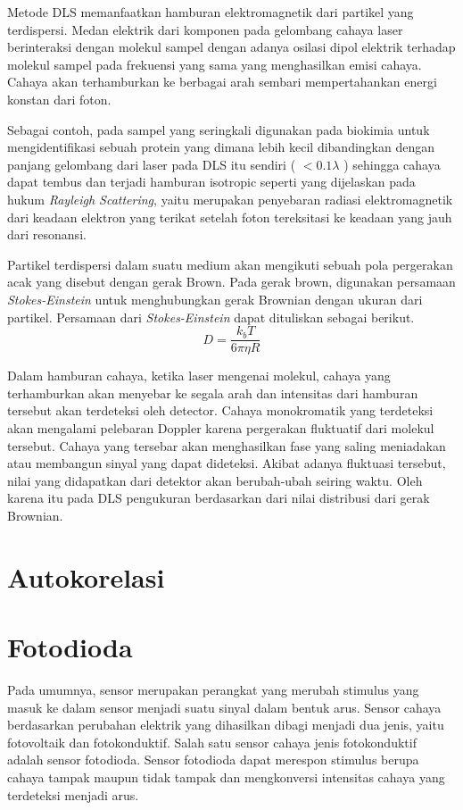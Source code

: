 Metode DLS memanfaatkan hamburan elektromagnetik dari partikel yang terdispersi. Medan elektrik
dari komponen pada gelombang cahaya laser berinteraksi dengan molekul sampel dengan adanya osilasi
dipol elektrik terhadap molekul sampel pada frekuensi yang sama yang menghasilkan emisi cahaya.
Cahaya akan terhamburkan ke berbagai arah sembari mempertahankan energi konstan dari foton. 

Sebagai contoh, pada sampel yang seringkali digunakan pada biokimia untuk mengidentifikasi sebuah
protein yang dimana lebih kecil dibandingkan dengan panjang gelombang dari laser pada DLS itu
sendiri ( $<0.1\lambda$ ) sehingga cahaya dapat tembus dan terjadi hamburan isotropic seperti yang
dijelaskan pada hukum \textit{Rayleigh Scattering}, yaitu merupakan penyebaran radiasi
elektromagnetik dari keadaan elektron yang terikat setelah foton tereksitasi ke keadaan yang jauh
dari resonansi\cite{Piazza2005}.

Partikel terdispersi dalam suatu medium akan mengikuti sebuah pola pergerakan acak yang disebut
dengan gerak Brown. Pada gerak brown, digunakan persamaan \textit{Stokes-Einstein} untuk
menghubungkan gerak Brownian dengan ukuran dari partikel\cite{Anindya2018}. Persamaan dari
\textit{Stokes-Einstein} dapat dituliskan sebagai berikut.
\begin{equation}
    D = \frac{k_b T}{6 \pi \eta R}
\end{equation}

Dalam hamburan cahaya, ketika laser mengenai molekul, cahaya yang terhamburkan akan menyebar ke
segala arah dan intensitas dari hamburan tersebut akan terdeteksi oleh detector. Cahaya monokromatik
yang terdeteksi akan mengalami pelebaran Doppler karena pergerakan fluktuatif dari molekul tersebut.
Cahaya yang tersebar akan menghasilkan fase yang saling meniadakan atau membangun sinyal yang dapat
dideteksi. Akibat adanya fluktuasi tersebut, nilai yang didapatkan dari detektor akan berubah-ubah
seiring waktu. Oleh karena itu pada DLS pengukuran berdasarkan dari nilai distribusi dari gerak
Brownian\cite{Falke2019,Pavan2022}. 



\section{Autokorelasi}




\section{Fotodioda}
Pada umumnya, sensor merupakan perangkat yang merubah stimulus yang masuk ke dalam sensor menjadi
suatu sinyal dalam bentuk arus. Sensor cahaya berdasarkan perubahan elektrik yang dihasilkan dibagi
menjadi dua jenis, yaitu fotovoltaik dan fotokonduktif. Salah satu sensor cahaya jenis fotokonduktif
adalah sensor fotodioda. Sensor fotodioda dapat merespon stimulus berupa cahaya tampak maupun tidak
tampak dan mengkonversi intensitas cahaya yang terdeteksi menjadi arus\cite{Setyaningsih2017}.

